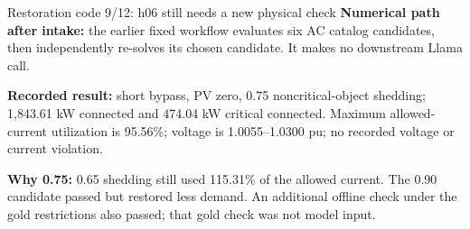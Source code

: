 \begin{frame}[t]{Restoration code 9/12: h06 still needs a new physical check}
\deepdive
{}
\footnotesize
\textbf{Numerical path after intake:} the earlier fixed workflow evaluates six AC catalog candidates, then independently re-solves its chosen candidate. It makes no downstream Llama call.
\par\smallskip\textbf{Recorded result:} short bypass, PV zero, 0.75 noncritical-object shedding; 1,843.61 kW connected and 474.04 kW critical connected. Maximum allowed-current utilization is 95.56\%; voltage is 1.0055--1.0300 pu; no recorded voltage or current violation.
\par\smallskip\textbf{Why 0.75:} 0.65 shedding still used 115.31\% of the allowed current. The 0.90 candidate passed but restored less demand. An additional offline check under the gold restrictions also passed; that gold check was not model input.
\end{frame}

